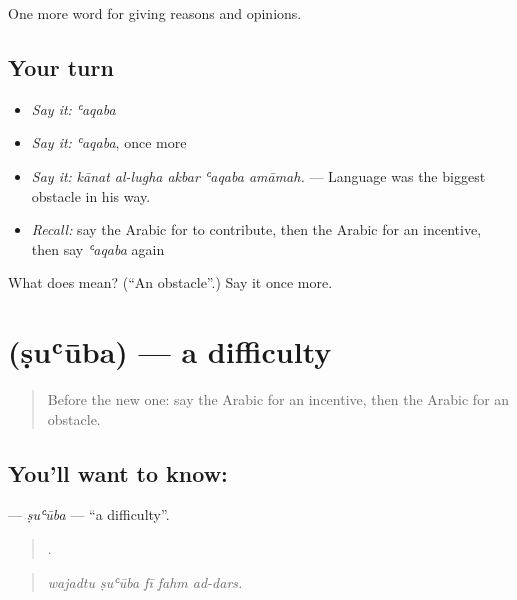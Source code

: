 \begin{grammarlens}[title={What you've built}]
One more word for giving reasons and opinions.
\end{grammarlens}

\subsection*{Your turn}
\begin{itemize}
\raggedright
  \item \emph{Say it:} \emph{ʿaqaba}
  \item \emph{Say it:} \emph{ʿaqaba}, once more
  \item \emph{Say it:} \emph{kānat al-lugha akbar ʿaqaba amāmah.} — Language was the biggest obstacle in his way.
  \item \emph{Recall:} say the Arabic for to contribute, then the Arabic for an incentive, then say \emph{ʿaqaba} again
\end{itemize}

\begin{tcolorbox}[breakable,colback=teal!4,colframe=teal!35!black,title={Before you move on}]
What does  mean? (\textquotedblleft{}An obstacle\textquotedblright{}.) Say it once more.
\end{tcolorbox}
\section[\texorpdfstring{\ar{صعوبة} (ṣuʿūba)}{صعوبة (ṣuʿūba)}]{ (ṣuʿūba) — a difficulty}

\label{lesson:AR-C372-suuba}



\begin{quote}
Before the new one: say the Arabic for an incentive, then the Arabic for an obstacle.
\end{quote}

\subsection*{You'll want to know: }
\textbf{} — \emph{ṣuʿūba} — \textquotedblleft{}a difficulty\textquotedblright{}.

\begin{quote}
    .
\end{quote}

\begin{quote}
\emph{wajadtu ṣuʿūba fī fahm ad-dars.}
\end{quote}

